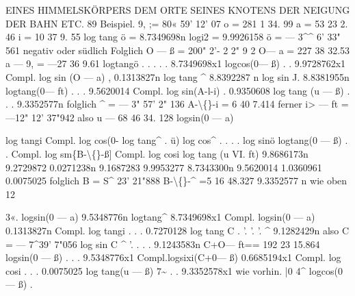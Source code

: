 \documentclass[12pt,a4paper]{article}
\begin{document}
\newpage

EINES  HIMMELSKÖRPERS  DEM  ORTE  SEINES  KNOTENS  DER  NEIGUNG  DER  BAHN  ETC.
89
Beispiel.
9,
;=
80«
59'
12'
07
o = 281
1
34. 99
a =
53
23
2. 46
i =
10
37
9. 55
log  tang  ö = 8.7349698n
logi2 = 9.9926158
ö  =  ---  3\^{}\^{}  6'  33" 561    negativ  oder  südlich
Folglich    O  --- ß  =     200"     2'-  2  2"  9  2
O--- a  =      227     38     32.53
a  ---  9,  =  ---27     36       9.61
logtangö      .      .      .      .      .  8.7349698x1
logcos(0--- ß)            .      .  9.9728762x1
Compl.  log  sin (O  ---  a)     ,  0.1313827n
log  tang \^{}    8.8392287  n
log  sin  J.    8.8381955n
logtang(0--- ft)    .      .     .  9.5620014
Compl.  log  sin(A-l-i)      .  0.9350608
log  tang (u  ---  ß)      .      .      .  9.3352577n
folglich
\^{}  =  ---  3"  57'   2"  136
A-\textbackslash\{\}-i  =        6     40     7.414
ferner
i>  --- ft  =  ---12"   12'    37"942
also
u  ---       68     46     34.  128
logsin(0  --- a)

log  tangi
Compl.  log  cos(0-
log  tang\^{}    .
ü)
log  cos\^{}  .  .  .  .
log  sinö
logtang(0  --- ß)  .  .
Compl.  log  sm\{B-\textbackslash\{\}-ß]
Compl.  log  cosi
log  tang  (u
VI.
ft)
9.8686173n
9.2729872
0.0271238n
9.1687283
9.9953277
8.7343300n
9.5620014
1.0360961
0.0075025
folglich
B  =  S\^{}  23'    21"888
B-\textbackslash\{\}-\^{}  =5     16     48.327
9.3352577  n        wie  oben
12

\newpage

3«.
logsin(0  --- a)                         9.5348776n
logtang\^{}
8.7349698x1
Compl.  logsin(0  --- a)         0.1313827n
Compl.  log  tangi   .     .     .      0.7270128
log  tang  C    .     '.     '.      '.      \^{}      9.1282429n       also  C  =  ---   7\^{}39'      7"056
log  sin  C      \^{}      '.      .     .     .      9.1243583n  C+O--- ft==     192     23     15.864
logsin(0  --- ß)       .     .     .      9.5348776x1
Compl.logsixi(C+0--- ß)   0.6685194x1
Compl.  log  cosi      .      .      .      0.0075025
log  tang(u  --- ß)      7\textasciitilde{} .     .     9.3352578x1       wie  vorhin.
|0
4\^{}
logcos(0
---
ß)
.
\end{document}
